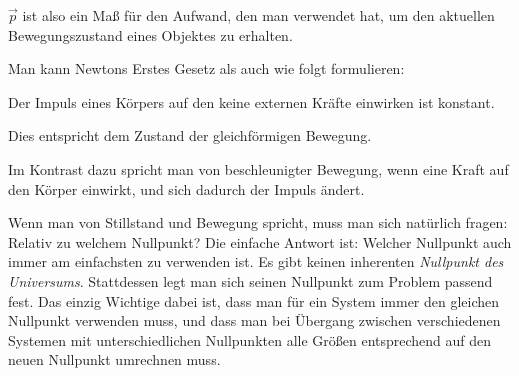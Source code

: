 $\vec{p}$ ist also ein Maß für den Aufwand, den man verwendet hat, um den aktuellen Bewegungszustand eines Objektes zu erhalten.

Man kann Newtons Erstes Gesetz als auch wie folgt formulieren:

\begin{mdframed}[backgroundcolor=SRH_Warm_Grey!50,skipabove=3em,skipbelow=1em,frametitle=Newtons erstes Gesetz (alternative Formulierung)]
Der Impuls eines Körpers auf den keine externen Kräfte einwirken ist konstant.
\end{mdframed}

Dies entspricht dem Zustand der gleichförmigen Bewegung.

Im Kontrast dazu spricht man von beschleunigter Bewegung, wenn eine Kraft auf den Körper einwirkt, und sich dadurch der Impuls ändert.

\begin{mdframed}[backgroundcolor=SRH_Warm_Grey!50,skipabove=3em,skipbelow=1em,frametitle=Exkurs: Wo ist der Mittelpunkt des Universums?] 
Wenn man von Stillstand und Bewegung spricht, muss man sich natürlich fragen: Relativ zu welchem Nullpunkt?
Die einfache Antwort ist: Welcher Nullpunkt auch immer am einfachsten zu verwenden ist. Es gibt keinen inherenten \textit{Nullpunkt des Universums}. Stattdessen legt man sich seinen Nullpunkt zum Problem passend fest. Das einzig Wichtige dabei ist, dass man für ein System immer den gleichen Nullpunkt verwenden muss, und dass man bei Übergang zwischen verschiedenen Systemen mit unterschiedlichen Nullpunkten alle Größen entsprechend auf den neuen Nullpunkt umrechnen muss.
\end{mdframed}

